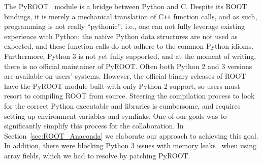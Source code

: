 \documentclass[a4paper]{jpconf}
\begin{document}
The PyROOT~\cite{1742-6596-664-6-062029} module is a bridge between Python and C. Despite its ROOT bindings,
it is merely a mechanical translation of C\texttt{++} function calls, and as such, programming is not really ``pythonic'', i.e., one 
can not fully leverage existing experience with Python;
the native Python data structures are not used as expected, and these function calls do not adhere to the common Python idioms. 
Furthermore, Python 3 is not yet fully supported, and at the moment of writing, there is no official maintainer of PyROOT.
Often both Python 2 and 3 versions are available on users' systems. However, the official binary releases of ROOT have the PyROOT module built with only Python 2 
support, so users must resort to compiling ROOT from source. Steering the compilation process to look for the correct Python executable and libraries is cumbersome,
and requires setting up environment variables and symlinks. One of our goals was to significantly simplify this process for the collaboration.
In Section~\ref{sec:ROOT_Anaconda} we elaborate our approach to achieving this goal.
In addition, there were blocking Python 3 issues with memory leaks~\cite{JIRA-ROOT-7854} when using array fields, which we had to resolve by patching PyROOT.
\end{document}
